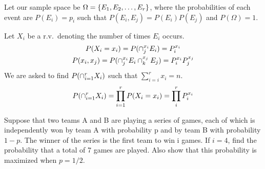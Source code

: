 \documentclass{article}
\begin{document}
    \begin{solution}
        Let our sample space be $\Omega = \{E_1, E_2, \ldots, E_r\}$, where the probabilities of each event are $P(E_i) = p_i$ such that $P(E_i, E_j) = P(E_i)P(E_j)$ and $P(\Omega) = 1$.

        Let $X_i$ be a r.v.~denoting the number of times $E_i$ occurs. 
        \begin{gather*}
            P(X_i = x_i) = P(\cap_j^{x_i} E_i) = P_i^{x_i} \\
            P(x_i, x_j) = P(\cap_j^{x_i}E_i \cap_k^{x_j}E_j) = P_i^{x_i} P_j^{x_j}
        \end{gather*}
        We are asked to find $P(\cap_{i=1}^{r}X_i)$ such that $\sum_{i=i}^r x_i = n$.
        \begin{equation}
            P(\cap_{i=1}^{r}X_i) = \prod_{i=1}^{r} P(X_i = x_i) = \prod_i^r P_i ^ {x_i}
        \end{equation}
    \end{solution}

    \nextproblem
    \nextproblem
    \begin{problem}
        Suppose that two teams A and B are playing a series of games, each of which is independently won by team A with probability p and by team B with probability $1 - p$. The winner of the series is the first team to win i games. If $i = 4$, find the probability that a total of 7 games are played. Also show that this probability is maximized when $p = 1/2$.
    \end{problem}
\end{document}
